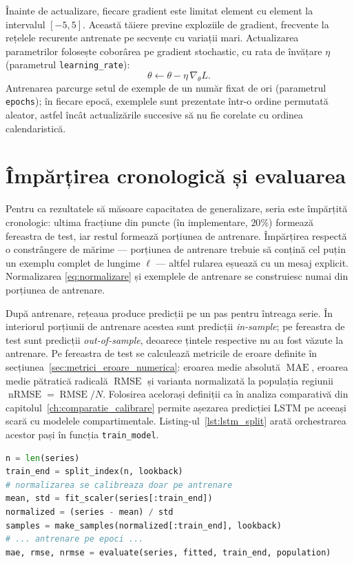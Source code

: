Înainte de actualizare, fiecare gradient este limitat element cu element la
intervalul $[-5, 5]$. Această tăiere previne exploziile de gradient, frecvente
la rețelele recurente antrenate pe secvențe cu variații mari. Actualizarea
parametrilor folosește coborârea pe gradient stochastic, cu rata de învățare
$\eta$ (parametrul \texttt{learning\_rate}):
\begin{equation}
\theta \leftarrow \theta - \eta\, \nabla_{\theta} L.
\end{equation}
Antrenarea parcurge setul de exemple de un număr fixat de ori (parametrul
\texttt{epochs}); în fiecare epocă, exemplele sunt prezentate într-o ordine
permutată aleator, astfel încât actualizările succesive să nu fie corelate cu
ordinea calendaristică.

\section{Împărțirea cronologică și evaluarea}
\label{sec:evaluare_lstm}

Pentru ca rezultatele să măsoare capacitatea de generalizare, seria este
împărțită cronologic: ultima fracțiune din puncte (în implementare, $20\%$)
formează fereastra de test, iar restul formează porțiunea de antrenare.
Împărțirea respectă o constrângere de mărime --- porțiunea de antrenare trebuie
să conțină cel puțin un exemplu complet de lungime $\ell$ --- altfel rularea
eșuează cu un mesaj explicit. Normalizarea \eqref{eq:normalizare} și exemplele
de antrenare se construiesc numai din porțiunea de antrenare.

După antrenare, rețeaua produce predicții pe un pas pentru întreaga serie. În
interiorul porțiunii de antrenare acestea sunt predicții \emph{in-sample}; pe
fereastra de test sunt predicții \emph{out-of-sample}, deoarece țintele
respective nu au fost văzute la antrenare. Pe fereastra de test se calculează
metricile de eroare definite în
secțiunea~\ref{sec:metrici_eroare_numerica}: eroarea medie absolută
$\operatorname{MAE}$, eroarea medie pătratică radicală $\operatorname{RMSE}$ și
varianta normalizată la populația regiunii
$\operatorname{nRMSE} = \operatorname{RMSE}/N$. Folosirea acelorași definiții ca
în analiza comparativă din capitolul~\ref{ch:comparatie_calibrare} permite
așezarea predicției LSTM pe aceeași scară cu modelele compartimentale.
Listing-ul~\ref{lst:lstm_split} arată orchestrarea acestor pași în funcția
\texttt{train\_model}.

\begin{lstlisting}[language=Python, caption={Împărțirea cronologică, normalizarea pe antrenare și evaluarea pe test.}, label={lst:lstm_split}]
n = len(series)
train_end = split_index(n, lookback)
# normalizarea se calibreaza doar pe antrenare
mean, std = fit_scaler(series[:train_end])
normalized = (series - mean) / std
samples = make_samples(normalized[:train_end], lookback)
# ... antrenare pe epoci ...
mae, rmse, nrmse = evaluate(series, fitted, train_end, population)
\end{lstlisting}

